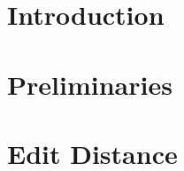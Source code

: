 \documentclass[a4paper,UKenglish]{lipics-v2021}
\begin{document}
	
	\maketitle
	
	
	
	\section{Introduction}\label{sec:introduction}
	
	
	
	\section{Preliminaries}\label{sec:preliminaries}
	
	
	
	\section{Edit Distance}\label{sec:edit-distance}
	
	
	
	
	
	
	
	
	
	
	
	\newpage
	
	
	
	\newpage
	\appendix
	
	
	
	
	
\end{document}
